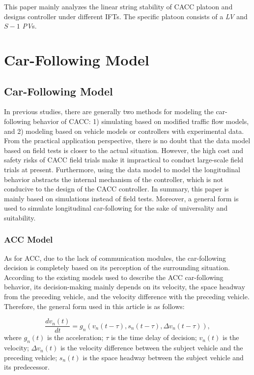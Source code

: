 \documentclass[journal]{IEEEtran}
\begin{document}
This paper mainly analyzes the linear string stability of CACC platoon and designs controller under different IFTs. The specific platoon consists of a \emph{LV} and $S-1$ \emph{PV}s.

\section{Car-Following Model}
\label{Section 3}
\subsection{Car-Following Model}

In previous studies, there are generally two methods for modeling the car-following behavior of CACC: 1) simulating based on modified traffic flow models,\citep{farah2014cooperative}\citep{yu2015effects}\citep{li2015stability} and 2) modeling based on vehicle models or controllers with experimental data.\citep{fernandes2014multiplatooning}\citep{milanes2014modeling}\citep{milanes2013cooperative} From the practical application perspective, there is no doubt that the data model based on field tests is closer to the actual situation. However, the high cost and safety risks of CACC field trials make it impractical to conduct large-scale field trials at present. Furthermore, using the data model to model the longitudinal behavior abstracts the internal mechanism of the controller, which is not conducive to the design of the CACC controller. In summary, this paper is mainly based on simulations instead of field tests. Moreover, a general form is used to simulate longitudinal car-following for the sake of universality and suitability.

\subsubsection{ACC Model}
As for ACC, due to the lack of communication modules, the car-following decision is completely based on its perception of the surrounding situation. According to the existing models used to describe the ACC car-following behavior, its decision-making mainly depends on its velocity, the space headway from the preceding vehicle, and the velocity difference with the preceding vehicle. Therefore, the general form used in this article is as follows:

\begin{equation}
\frac{d v_{n}(t)}{d t}=g_{n}\left(v_{n}(t-\tau), s_{n}(t-\tau), \Delta v_{n}(t-\tau)\right),
\label{Eq1}
\end{equation}
where $g_n (t)$ is the acceleration; $\tau$ is the time delay of decision; $v_n (t)$ is the velocity; $\Delta v_n (t)$ is the velocity difference between the subject vehicle and the preceding vehicle; $s_n (t)$ is the space headway between the subject vehicle and its predecessor.
\end{document}
